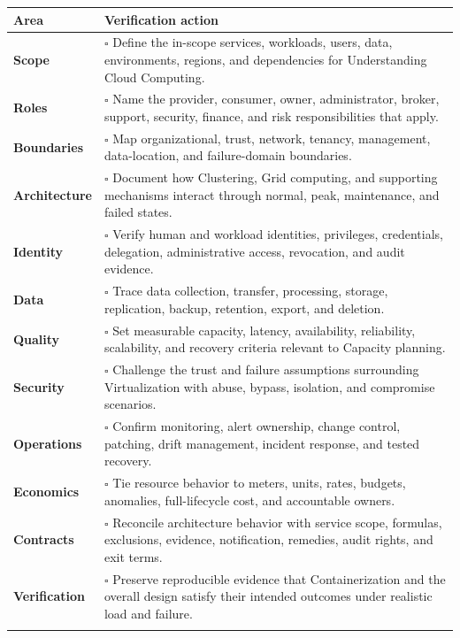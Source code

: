 \documentclass[11pt]{article}
\begin{document}
\begin{longtable}{@{}>{\bfseries\color{Teal}}p{}>{\RaggedRight\arraybackslash}p{}@{}}
\toprule\textbf{Area} & \textbf{Verification action}\\\midrule\endhead
Scope & $\square$ Define the in-scope services, workloads, users, data, environments, regions, and dependencies for Understanding Cloud Computing. \\\addlinespace[2pt]
Roles & $\square$ Name the provider, consumer, owner, administrator, broker, support, security, finance, and risk responsibilities that apply. \\\addlinespace[2pt]
Boundaries & $\square$ Map organizational, trust, network, tenancy, management, data-location, and failure-domain boundaries. \\\addlinespace[2pt]
Architecture & $\square$ Document how Clustering, Grid computing, and supporting mechanisms interact through normal, peak, maintenance, and failed states. \\\addlinespace[2pt]
Identity & $\square$ Verify human and workload identities, privileges, credentials, delegation, administrative access, revocation, and audit evidence. \\\addlinespace[2pt]
Data & $\square$ Trace data collection, transfer, processing, storage, replication, backup, retention, export, and deletion. \\\addlinespace[2pt]
Quality & $\square$ Set measurable capacity, latency, availability, reliability, scalability, and recovery criteria relevant to Capacity planning. \\\addlinespace[2pt]
Security & $\square$ Challenge the trust and failure assumptions surrounding Virtualization with abuse, bypass, isolation, and compromise scenarios. \\\addlinespace[2pt]
Operations & $\square$ Confirm monitoring, alert ownership, change control, patching, drift management, incident response, and tested recovery. \\\addlinespace[2pt]
Economics & $\square$ Tie resource behavior to meters, units, rates, budgets, anomalies, full-lifecycle cost, and accountable owners. \\\addlinespace[2pt]
Contracts & $\square$ Reconcile architecture behavior with service scope, formulas, exclusions, evidence, notification, remedies, audit rights, and exit terms. \\\addlinespace[2pt]
Verification & $\square$ Preserve reproducible evidence that Containerization and the overall design satisfy their intended outcomes under realistic load and failure. \\\addlinespace[2pt]
\bottomrule
\end{longtable}
\end{document}
